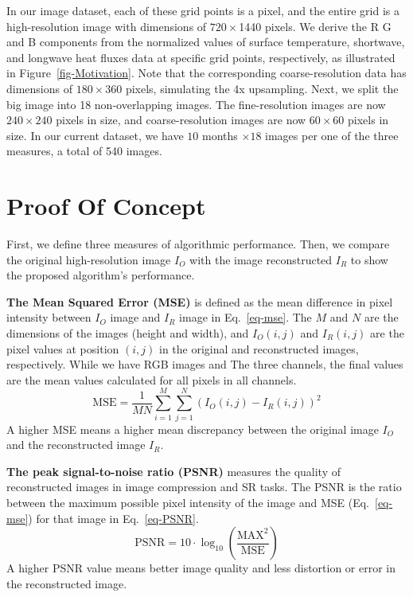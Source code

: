 \documentclass[pdflatex,sn-mathphys-num]{sn-jnl}%
\begin{document}
In our image dataset, each of these grid points is a pixel, and the entire grid is a high-resolution image with dimensions of $720 \times $1440 pixels. We derive the R G and B components from the normalized values of surface temperature, shortwave, and longwave heat fluxes data at specific grid points, respectively, as illustrated in Figure~\ref{fig-Motivation}. Note that the corresponding coarse-resolution data has dimensions of $180 \times $360 pixels, simulating the 4x upsampling. Next, we split the big image into 18 non-overlapping images. The fine-resolution images are now $240 \times 240$ pixels in size, and coarse-resolution images are now $60 \times 60$ pixels in size\cite{Nikhil2024}. In our current dataset, we have $10$ months $\times 18$ images per one of the three measures, a total of 540 images. 



\section{Proof Of Concept}
\label{sec-POC}

First, we define three measures of algorithmic performance. Then, we compare the original high-resolution image $I_O$ with the image reconstructed $I_R$ to show the proposed algorithm's performance. 

\noindent \textbf{The Mean Squared Error (MSE)} is defined as the mean difference in pixel intensity between $I_O $ image and $I_R $ image in Eq.~\ref{eq-mse}. The $M $ and $N $ are the dimensions of the images (height and width), and $ I_O(i,j) $ and $ I_R(i,j) $ are the pixel values at position $(i,j) $ in the original and reconstructed images, respectively. While we have RGB images and The three channels, the final values are the mean values calculated for all pixels in all channels.
\begin{equation}
\text{MSE} = \frac{1}{MN} \sum_{i=1}^{M} \sum_{j=1}^{N} \left( I_O(i,j) - I_R(i,j) \right)^2
\label{eq-mse} \end{equation}
A higher MSE means a higher mean discrepancy between the original image $I_O $ and the reconstructed image $I_R$. 

\noindent \textbf{The peak signal-to-noise ratio (PSNR)} measures the quality of reconstructed images in image compression and SR tasks. The PSNR is the ratio between the maximum possible pixel intensity of the image and MSE (Eq.~\ref{eq-mse}) for that image in Eq.~\ref{eq-PSNR}. \begin{equation}
\text{PSNR} = 10 \cdot \log_{10} \left(\frac{\text{MAX}^2}{\text{MSE}}\right) \label{eq-PSNR}
\end{equation} A higher PSNR value means better image quality and less distortion or error in the reconstructed image.
\end{document}

